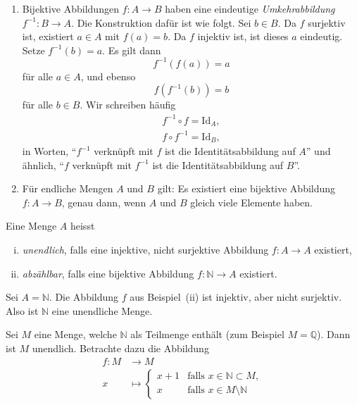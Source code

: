 \documentclass[../main.tex]{subfiles}
\begin{document}
\begin{remark}
  \leavevmode
  \begin{enumerate}[(1)]
    \item Bijektive Abbildungen $f \colon A \to B$ haben eine eindeutige \emph{Umkehrabbildung}
      $f^{-1} \colon B \to A$. Die Konstruktion dafür ist wie folgt. Sei $b \in B$.
      Da $f$ surjektiv ist, existiert $a \in A$ mit $f(a) = b$. Da $f$
      injektiv ist, ist dieses $a$ eindeutig. Setze $f^{-1}(b) = a$. Es gilt dann
      \[f^{-1}(f(a)) = a\]
      für alle $a \in A$, und ebenso
      \[f(f^{-1}(b)) = b\]
      für alle $b \in B$. Wir schreiben häufig
      \begin{align*}
        f^{-1} \circ f = \textrm{Id}_{A}, \\
        f \circ f^{-1} = \textrm{Id}_{B},
      \end{align*}
      in Worten, ``$f^{-1}$ verknüpft mit $f$ ist die Identitätsabbildung auf $A$''
      und ähnlich, ``$f$ verknüpft mit $f^{-1}$ ist die Identitätsabbildung auf $B$''.
    \item Für endliche Mengen $A$ und $B$ gilt: Es existiert eine bijektive Abbildung
      $f: A \to B$, genau dann, wenn $A$ und $B$ gleich viele Elemente haben.
  \end{enumerate}
\end{remark}

\begin{definition}
  Eine Menge $A$ heisst
  \begin{enumerate}[(i)]
    \item \emph{unendlich}, falls eine injektive, nicht surjektive Abbildung
      $f: A \to A$ existiert,
    \item \emph{abzählbar}, falls eine bijektive Abbildung $f \colon \mathbb N \to A$
      existiert.
  \end{enumerate}
\end{definition}

\begin{example}
  Sei $A = \mathbb N$. Die Abbildung $f$ aus Beispiel~(ii) ist injektiv,
  aber nicht surjektiv. Also ist $\mathbb N$ eine unendliche Menge.
\end{example}

\begin{example}
  Sei $M$ eine Menge, welche $\mathbb N$ als Teilmenge enthält
  (zum Beispiel $M = \mathbb Q$).
  Dann ist $M$ unendlich. Betrachte dazu die Abbildung
  \begin{align*}
    f \colon M &\to M \\
    x &\mapsto
      \begin{cases}
        x+1 & \mbox{falls }x \in \mathbb N \subset M, \\
        x & \mbox{falls }x \in M \setminus \mathbb N
      \end{cases}
  \end{align*}
\end{example}
\end{document}
